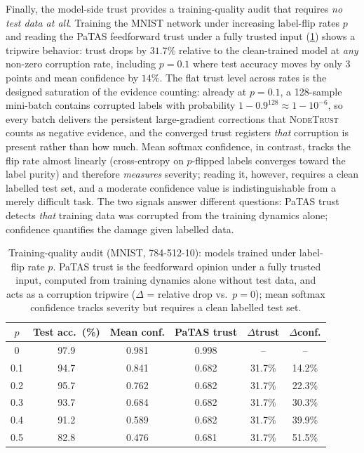 Finally, the model-side trust provides a training-quality audit that requires \emph{no test data at all}. Training the MNIST network under increasing label-flip rates $p$ and reading the PaTAS feedforward trust under a fully trusted input (\cref{tab:audit}) shows a tripwire behavior: trust drops by $31.7\%$ relative to the clean-trained model at \emph{any} non-zero corruption rate, including $p{=}0.1$ where test accuracy moves by only $3$ points and mean confidence by $14\%$. The flat trust level across rates is the designed saturation of the evidence counting: already at $p{=}0.1$, a 128-sample mini-batch contains corrupted labels with probability $1-0.9^{128} \approx 1-10^{-6}$, so every batch delivers the persistent large-gradient corrections that \textsc{NodeTrust} counts as negative evidence, and the converged trust registers \emph{that} corruption is present rather than how much. Mean softmax confidence, in contrast, tracks the flip rate almost linearly (cross-entropy on $p$-flipped labels converges toward the label purity) and therefore \emph{measures} severity; reading it, however, requires a clean labelled test set, and a moderate confidence value is indistinguishable from a merely difficult task. The two signals answer different questions: PaTAS trust detects \emph{that} training data was corrupted from the training dynamics alone; confidence quantifies the damage given labelled data.

\begin{table}[ht]
\centering
\setlength{\tabcolsep}{5pt}
\begin{tabular}{cccccc}
\toprule
$p$ & Test acc.\ (\%) & Mean conf. & PaTAS trust & $\Delta$trust & $\Delta$conf. \\
\midrule
0   & 97.9 & 0.981 & 0.998 & --     & --     \\
0.1 & 94.7 & 0.841 & 0.682 & 31.7\% & 14.2\% \\
0.2 & 95.7 & 0.762 & 0.682 & 31.7\% & 22.3\% \\
0.3 & 93.7 & 0.684 & 0.682 & 31.7\% & 30.3\% \\
0.4 & 91.2 & 0.589 & 0.682 & 31.7\% & 39.9\% \\
0.5 & 82.8 & 0.476 & 0.681 & 31.7\% & 51.5\% \\
\bottomrule
\end{tabular}
\caption{Training-quality audit (MNIST, 784-512-10): models trained under label-flip rate $p$. PaTAS trust is the feedforward opinion under a fully trusted input, computed from training dynamics alone without test data, and acts as a corruption tripwire ($\Delta$ = relative drop vs.\ $p{=}0$); mean softmax confidence tracks severity but requires a clean labelled test set.}
\label{tab:audit}
\end{table}
